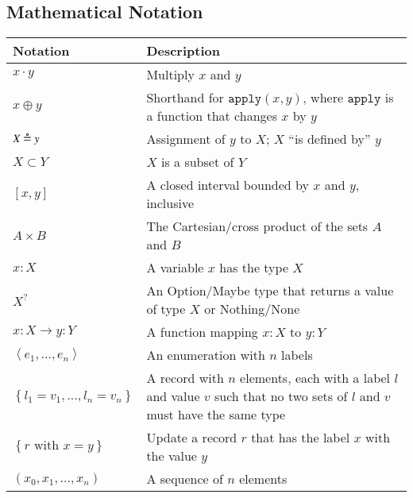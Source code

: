 \subsection{Mathematical Notation}

\begin{center}

    \renewcommand{\arraystretch}{1.2}
    \begin{tabular}{C{0.2\textwidth} m{0.7\textwidth}}
        \toprule
        \textbf{Notation} & \textbf{Description}\\
        \midrule

        $x \cdot y$ & Multiply $x$ and $y$ \\

        $x \oplus y$ & Shorthand for $\mathtt{apply}(x, y)$, where
        $\mathtt{apply}$ is a function that changes $x$ by $y$ \\

        $X \defEq y $ & Assignment of $y$ to $X$; $X$
        ``is defined by'' $y$\\

        $X \subset Y $ & $X$ is a subset of $Y$\\

        $\left[x,y\right]$ & A closed interval bounded
        by $x$ and $y$, inclusive \\

        $A \times B$ & The Cartesian/cross product of the sets $A$ and $B$ \\

        $x : X$ & A variable $x$ has the type $X$ \\

        $X^?$ & An Option/Maybe type that returns a value of type $X$ or 
        Nothing/None \\

        $x : X \rightarrow y : Y$ & A function mapping $x : 
        X$ to $y : Y$ \\

        $\left< e_1, ..., e_n \right>$ & An enumeration with $n$ labels \\

        $\left\{ l_1 = v_1, ..., l_n = v_n \right\}$ & A 
        record with $n$ elements, each with a label $l$ and value $v$ such that 
        no two sets of $l$ and $v$ must have the same type \\

        $\left\{ r \text{ with } x = y \right\}$ & Update a record $r$ that has 
        the label $x$ with the value $y$ \\

        $\left(x_0, x_1, ..., x_n\right)$ & A sequence of 
        $n$ elements \\

        \bottomrule
    \end{tabular}

\end{center}

